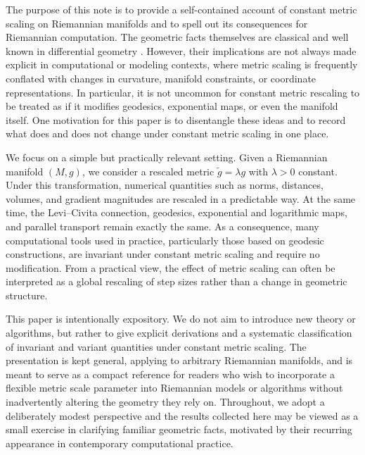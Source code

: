 \documentclass[11pt]{article}
\begin{document}
The purpose of this note is to provide a self-contained account of constant metric scaling on Riemannian manifolds and to spell out its consequences for Riemannian computation. The geometric facts themselves are classical and well known in differential geometry \citep{docarmo_1992_RiemannianGeometry, lee_1997_RiemannianManifoldsIntroduction}. However, their implications are not always made explicit in computational or modeling contexts, where metric scaling is frequently conflated with changes in curvature, manifold constraints, or coordinate representations. In particular, it is not uncommon for constant metric rescaling to be treated as if it modifies geodesics, exponential maps, or even the manifold itself. One motivation for this paper is to disentangle these ideas and to record what does and does not change under constant metric scaling in one place.

We focus on a simple but practically relevant setting. Given a Riemannian manifold $(M,g)$, we consider a rescaled metric $\tilde g = \lambda g$ with $\lambda>0$ constant. Under this transformation, numerical quantities such as norms, distances, volumes, and gradient magnitudes are rescaled in a predictable way. At the same time, the Levi--Civita connection, geodesics, exponential and logarithmic maps, and parallel transport remain exactly the same. As a consequence, many computational tools used in practice, particularly those based on geodesic constructions, are invariant under constant metric scaling and require no modification. From a practical view, the effect of metric scaling can often be interpreted as a global rescaling of step sizes rather than a change in geometric structure.

This paper is intentionally expository. We do not aim to introduce new theory or algorithms, but rather to give explicit derivations and a systematic classification of invariant and variant quantities under constant metric scaling. The presentation is kept general, applying to arbitrary Riemannian manifolds, and is meant to serve as a compact reference for readers who wish to incorporate a flexible metric scale parameter into Riemannian models or algorithms without inadvertently altering the geometry they rely on. Throughout, we adopt a deliberately modest perspective and the results collected here may be viewed as a small exercise in clarifying familiar geometric facts, motivated by their recurring appearance in contemporary computational practice.

\end{document}
